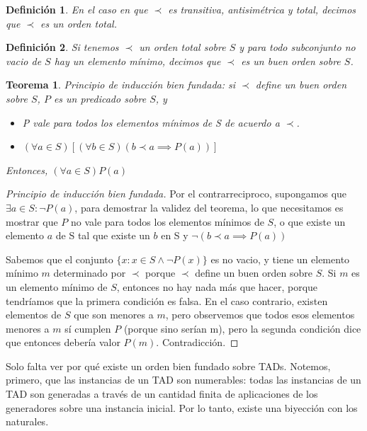 \documentclass[10pt,a4paper,notitlepage]{article}
\newtheorem{deftn}{Definición}
\newtheorem{defthm}{Teorema}
\begin{document}
\begin{deftn}
En el caso en que $\prec$ es transitiva, antisimétrica y total, decimos que $\prec$ es un orden total.
\end{deftn}

\begin{deftn}
Si tenemos $\prec$ un orden total sobre $S$ y para todo subconjunto no vacio de $S$ hay un elemento mínimo, decimos que $\prec$ es un buen orden sobre $S$.
\end{deftn}

\begin{defthm}
Principio de inducción bien fundada: si $\prec$ define un buen orden sobre $S$, $P$ es un predicado sobre $S$, y

\begin{itemize}
\item P vale para todos los elementos mínimos de S de acuerdo a $\prec$.
\item $(\forall a \in S) [(\forall b \in S) (b \prec a \implies P(a))]$
\end{itemize}

Entonces, $(\forall a \in S) P(a)$
\end{defthm}

\begin{proof}[Principio de inducción bien fundada]
Por el contrarreciproco, supongamos que $\exists a \in S : \neg P(a)$, para demostrar la validez del teorema, lo que necesitamos es mostrar que $P$ no vale para todos los elementos mínimos de $S$, o que existe un elemento $a$ de S tal que existe un $b$ en S y $\neg(b \prec a \implies P(a))$

Sabemos que el conjunto $\{x : x \in S \wedge \neg P(x)\}$ es no vacio, y tiene un elemento mínimo $m$ determinado por $\prec$ porque $\prec$ define un buen orden sobre $S$. Si $m$ es un elemento mínimo de $S$, entonces no hay nada más que hacer, porque tendríamos que la primera condición es falsa. En el caso contrario, existen elementos de $S$ que son menores a $m$, pero observemos que todos esos elementos menores a $m$ sí cumplen $P$ (porque sino serían m), pero la segunda condición dice que entonces debería valor $P(m)$. Contradicción.
\end{proof}

Solo falta ver por qué existe un orden bien fundado sobre TADs. Notemos, primero, que las instancias de un TAD son numerables: todas las instancias de un TAD son generadas a través de un cantidad finita de aplicaciones de los generadores sobre una instancia inicial. Por lo tanto, existe una biyección con los naturales.
\end{document}
